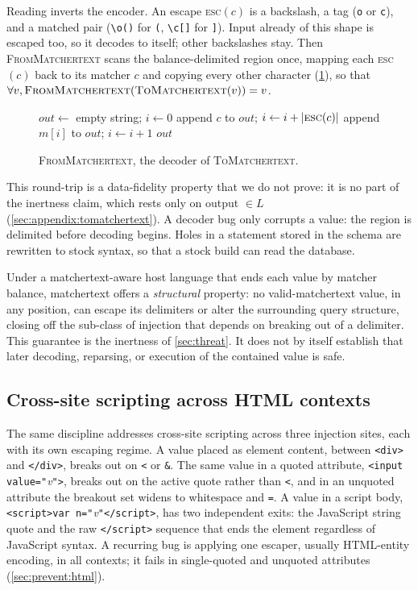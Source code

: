 Reading inverts the encoder. An escape \textsc{esc}$(c)$ is a backslash, a tag
(\texttt{o} or \texttt{c}), and a matched pair (\verb|\o()| for \verb|(|,
\verb|\c[]| for \verb|]|). Input already of this shape is escaped too, so it
decodes to itself; other backslashes stay. Then
\textsc{FromMatchertext} scans the balance-delimited region once, mapping each
\textsc{esc}$(c)$ back to its matcher $c$ and copying every other character
(\cref{fig:frommt}), so that $\forall v, \textsc{FromMatchertext}(\textsc{ToMatchertext}(v)) = v$.
\begin{figure}[t]
\small
\begin{algorithmic}
  \State $\mathit{out} \gets$ empty string; $i \gets 0$
      \State append $c$ to $\mathit{out}$; $i \gets i + |\textsc{esc}(c)|$
    \Else
      \State append $m[i]$ to $\mathit{out}$; $i \gets i + 1$
    \EndIf
  \EndWhile
  \State \Return $\mathit{out}$
\EndFunction
\end{algorithmic}
\caption{\textsc{FromMatchertext}, the decoder of \textsc{ToMatchertext}.}
\label{fig:frommt}
\end{figure}
This round-trip is a data-fidelity property that we do not prove: it is
no part of the inertness claim, which rests only on output $\in L$
(\cref{sec:appendix:tomatchertext}).
A decoder bug only corrupts a value: the region is delimited before decoding
begins.
Holes in a statement stored in the schema are rewritten to stock syntax, so
that a stock build can read the database.

Under a matchertext-aware host language that ends each value by matcher balance,
matchertext offers a \emph{structural} property: no valid-matchertext value,
in any position, can escape its delimiters or alter the surrounding query
structure, closing off the sub-class of injection that depends on breaking out
of a delimiter. This guarantee is the inertness of \cref{sec:threat}. It does not by itself
establish that later decoding, reparsing, or execution of the contained value
is safe.

\subsection{Cross-site scripting across HTML contexts}
\label{sec:resist:xss}

The same discipline addresses cross-site scripting across three
injection sites, each with its own escaping regime.
A value placed as element content, between \verb|<div>| and \verb|</div>|, breaks
out on \verb|<| or \verb|&|.
The same value in a quoted attribute, \verb|<input value="|\emph{v}\verb|">|,
breaks out on the active quote rather than \verb|<|, and in an unquoted attribute
the breakout set widens to whitespace and \verb|=|.
A value in a script body, \verb|<script>var n="|\emph{v}\verb|"</script>|, has two
independent exits: the JavaScript string quote and the raw \verb|</script>|
sequence that ends the element regardless of JavaScript syntax.
A recurring bug is applying one escaper, usually HTML-entity encoding, in all
contexts; it fails in single-quoted and unquoted attributes
(\cref{sec:prevent:html}).

